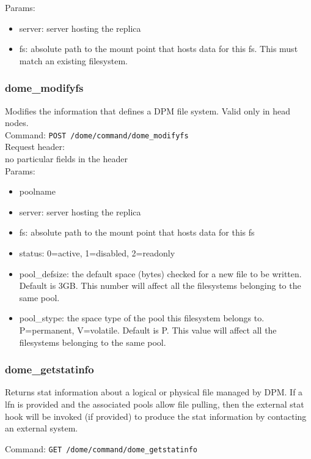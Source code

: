 \documentclass[a4paper,10pt]{scrreprt}
\begin{document}
Params:
\begin{itemize}
 \item server: server hosting the replica
 \item fs: absolute path to the mount point that hosts data for this fs. This must match an existing filesystem.
\end{itemize}


\subsubsection{dome\_modifyfs}

Modifies the information that defines a DPM file system. Valid only in head nodes.\\
Command:
\lstinline"POST /dome/command/dome_modifyfs"\\
Request header:\\
 no particular fields in the header\\

Params:
\begin{itemize}
 \item poolname
 \item server: server hosting the replica
 \item fs: absolute path to the mount point that hosts data for this fs
 \item status: 0=active, 1=disabled, 2=readonly
 \item pool\_defsize: the default space (bytes) checked for a new file to be written. Default is 3GB. This number will affect all the filesystems belonging to the same pool.
 \item pool\_stype: the space type of the pool this filesystem belongs to. P=permanent, V=volatile. Default is P. This value will affect all the filesystems belonging to the same pool.
\end{itemize}


\subsubsection{dome\_getstatinfo}
Returns stat information about a logical or physical file managed by DPM.
If a lfn is provided and the associated pools allow file pulling, then the external stat hook will be invoked (if provided)
to produce the stat information by contacting an external system.

Command:
\lstinline"GET /dome/command/dome_getstatinfo"\\
\end{document}
